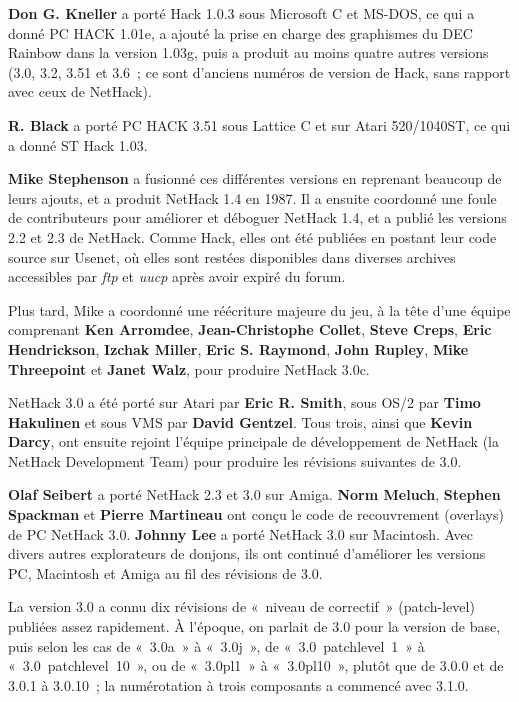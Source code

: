 \documentclass[titlepage]{article}
\begin{document}
\textbf{Don G. Kneller} a porté Hack 1.0.3 sous Microsoft C et MS-DOS, ce qui
a donné PC HACK 1.01e, a ajouté la prise en charge des graphismes du DEC
Rainbow dans la version 1.03g, puis a produit au moins quatre autres
versions (3.0, 3.2, 3.51 et 3.6~; ce sont d'anciens numéros de version de
Hack, sans rapport avec ceux de NetHack).


\textbf{R. Black} a porté PC HACK 3.51 sous Lattice C et sur Atari
520/1040ST, ce qui a donné ST Hack 1.03.


\textbf{Mike Stephenson} a fusionné ces différentes versions en reprenant
beaucoup de leurs ajouts, et a produit NetHack 1.4 en 1987.
Il a ensuite coordonné une foule de contributeurs pour améliorer et
déboguer NetHack 1.4, et a publié les versions 2.2 et 2.3 de NetHack.
Comme Hack, elles ont été publiées en postant leur code source sur Usenet,
où elles sont restées disponibles dans diverses archives accessibles par
\textit{ftp} et \textit{uucp} après avoir expiré du forum.


Plus tard, Mike a coordonné une réécriture majeure du jeu, à la tête d'une
équipe comprenant \textbf{Ken Arromdee}, \textbf{Jean-Christophe Collet},
\textbf{Steve Creps}, \textbf{Eric Hendrickson}, \textbf{Izchak Miller},
\textbf{Eric S. Raymond}, \textbf{John Rupley}, \textbf{Mike Threepoint} et
\textbf{Janet Walz}, pour produire NetHack 3.0c.


NetHack 3.0 a été porté sur Atari par \textbf{Eric R. Smith}, sous OS/2 par
\textbf{Timo Hakulinen} et sous VMS par \textbf{David Gentzel}.
Tous trois, ainsi que \textbf{Kevin Darcy}, ont ensuite rejoint l'équipe
principale de développement de NetHack (la NetHack Development Team) pour
produire les révisions suivantes de 3.0.


\textbf{Olaf Seibert} a porté NetHack 2.3 et 3.0 sur Amiga.
\textbf{Norm Meluch}, \textbf{Stephen Spackman} et \textbf{Pierre Martineau} ont
conçu le code de recouvrement (overlays) de PC NetHack 3.0.
\textbf{Johnny Lee} a porté NetHack 3.0 sur Macintosh.
Avec divers autres explorateurs de donjons, ils ont continué d'améliorer
les versions PC, Macintosh et Amiga au fil des révisions de 3.0.


La version 3.0 a connu dix révisions de «~niveau de correctif~»
(patch-level) publiées assez rapidement.
À l'époque, on parlait de 3.0 pour la version de base, puis selon les cas
de «~3.0a~» à «~3.0j~»,
de «~3.0~patchlevel~1~» à «~3.0~patchlevel~10~»,
ou de «~3.0pl1~» à «~3.0pl10~»,
plutôt que de 3.0.0 et de 3.0.1 à 3.0.10~; la numérotation à trois
composants a commencé avec 3.1.0.
\end{document}
